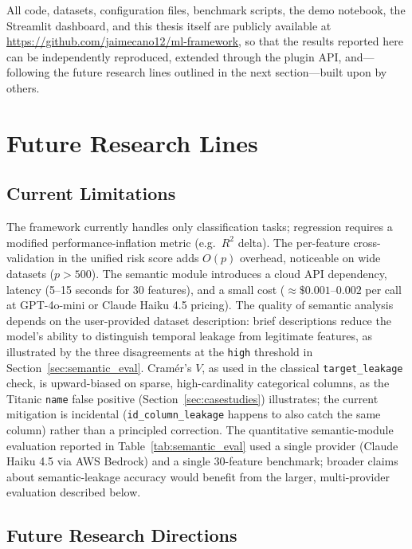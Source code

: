 \documentclass[12pt,a4paper]{report}
\begin{document}
All code, datasets, configuration files, benchmark scripts, the demo notebook, the Streamlit
dashboard, and this thesis itself are publicly available at
\url{https://github.com/jaimecano12/ml-framework}, so that the results reported here can be
independently reproduced, extended through the plugin API, and---following the future
research lines outlined in the next section---built upon by others.

\section{Future Research Lines}
\label{sec:future}

\subsection{Current Limitations}

The framework currently handles only classification tasks; regression requires a modified
performance-inflation metric (e.g.\ $R^2$ delta).  The per-feature cross-validation in the
unified risk score adds $O(p)$ overhead, noticeable on wide datasets ($p>500$).  The
semantic module introduces a cloud API dependency, latency (5--15 seconds for 30 features),
and a small cost ($\approx\$0.001$--$0.002$ per call at GPT-4o-mini or Claude Haiku 4.5
pricing).  The quality of
semantic analysis depends on the user-provided dataset description: brief descriptions
reduce the model's ability to distinguish temporal leakage from legitimate features, as
illustrated by the three disagreements at the \texttt{high} threshold in
Section~\ref{sec:semantic_eval}. Cram\'er's $V$, as used in the classical \texttt{target\_leakage} check, is upward-biased on
sparse, high-cardinality categorical columns, as the Titanic \texttt{name} false positive
(Section~\ref{sec:casestudies}) illustrates; the current mitigation is incidental
(\texttt{id\_column\_leakage} happens to also catch the same column) rather than a
principled correction.  The quantitative semantic-module evaluation
reported in Table~\ref{tab:semantic_eval} used a single provider (Claude Haiku 4.5 via AWS
Bedrock) and a single 30-feature benchmark; broader claims about semantic-leakage accuracy
would benefit from the larger, multi-provider evaluation described below.

\subsection{Future Research Directions}
\end{document}
